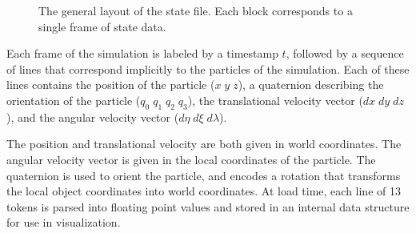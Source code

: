 \begin{figure}[htbp]
\centering
{}
\caption[The general layout of the state file]{The general layout of the state file.  Each block corresponds to a single frame of state data.}
\label{statefile-layout}
\end{figure}

	Each frame of the simulation is labeled by a timestamp $t$, followed by a sequence of lines that correspond implicitly to the particles of the simulation.  Each of these lines contains the position of the particle ($x \; y \; z$), a quaternion describing the orientation of the particle ($q_0 \; q_1 \; q_2 \; q_3$), the translational velocity vector ($dx \; dy \; dz$), and the angular velocity vector ($d\eta \; d\xi \; d\lambda$).
	
	The position and translational velocity are both given in world coordinates.  The angular velocity vector is given in the local coordinates of the particle.  The quaternion is used to orient the particle, and encodes a rotation that transforms the local object coordinates into world coordinates.  At load time, each line of 13 tokens is parsed into floating point values and stored in an internal data structure for use in visualization.
		
